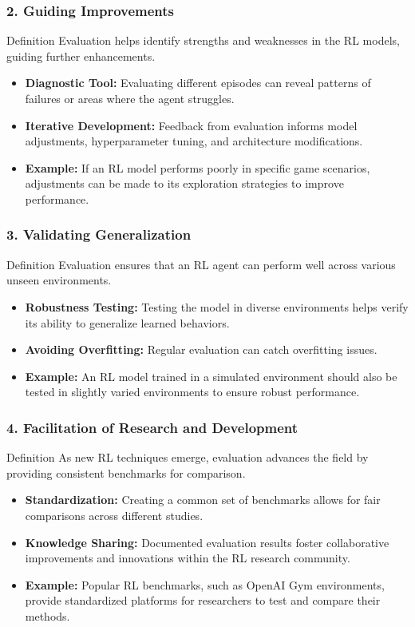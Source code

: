 \documentclass{beamer}
\begin{document}
\begin{frame}[fragile]
    \frametitle{2. Guiding Improvements}
    \begin{block}{Definition}
        Evaluation helps identify strengths and weaknesses in the RL models, guiding further enhancements.
    \end{block}
    \begin{itemize}
        \item \textbf{Diagnostic Tool:} Evaluating different episodes can reveal patterns of failures or areas where the agent struggles.
        \item \textbf{Iterative Development:} Feedback from evaluation informs model adjustments, hyperparameter tuning, and architecture modifications.
        \item \textbf{Example:} If an RL model performs poorly in specific game scenarios, adjustments can be made to its exploration strategies to improve performance.
    \end{itemize}
\end{frame}

\begin{frame}[fragile]
    \frametitle{3. Validating Generalization}
    \begin{block}{Definition}
        Evaluation ensures that an RL agent can perform well across various unseen environments.
    \end{block}
    \begin{itemize}
        \item \textbf{Robustness Testing:} Testing the model in diverse environments helps verify its ability to generalize learned behaviors.
        \item \textbf{Avoiding Overfitting:} Regular evaluation can catch overfitting issues.
        \item \textbf{Example:} An RL model trained in a simulated environment should also be tested in slightly varied environments to ensure robust performance.
    \end{itemize}
\end{frame}

\begin{frame}[fragile]
    \frametitle{4. Facilitation of Research and Development}
    \begin{block}{Definition}
        As new RL techniques emerge, evaluation advances the field by providing consistent benchmarks for comparison.
    \end{block}
    \begin{itemize}
        \item \textbf{Standardization:} Creating a common set of benchmarks allows for fair comparisons across different studies.
        \item \textbf{Knowledge Sharing:} Documented evaluation results foster collaborative improvements and innovations within the RL research community.
        \item \textbf{Example:} Popular RL benchmarks, such as OpenAI Gym environments, provide standardized platforms for researchers to test and compare their methods.
    \end{itemize}
\end{frame}
\end{document}
